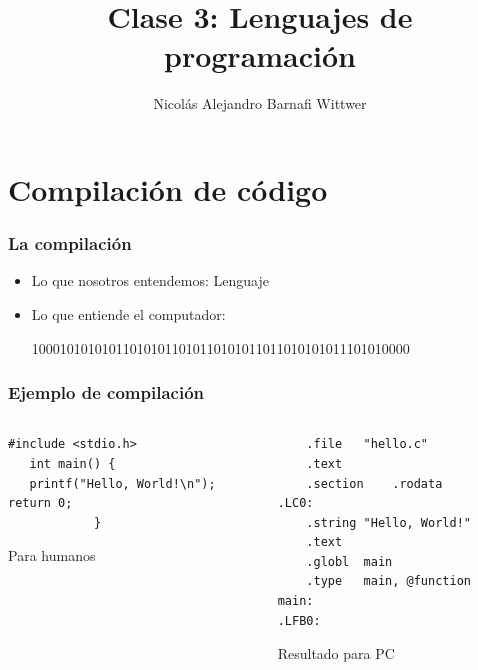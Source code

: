 \documentclass[14pt,aspectratio=169,xcolor=dvipsnames]{beamer}
\title[short title]{Clase 3: Lenguajes de programación}
\subtitle{}
\author[NA Barnafi] {Nicolás Alejandro Barnafi Wittwer}
\institute[UC|CMM] 
{
    Pontificia Universidad Católica de Chile \\
    Centro de Modelamiento Matemático
}
\begin{document}
\begin{frame}
    \maketitle
\end{frame}
\section{Compilación de código}
\begin{frame}[t]\frametitle{La compilación}

    \vspace{1cm}
    \begin{itemize}
        \item<+-> Lo que nosotros entendemos: Lenguaje
        \item<+-> Lo que entiende el computador: 
    
        100010101010110101011010110101011011010101011101010000
            
    \end{itemize}
\end{frame}
\begin{frame}[fragile]\frametitle{Ejemplo de compilación}
\begin{small}
    \begin{columns}
        \begin{column}[b]{0.5\textwidth}
            \begin{verbatim}
#include <stdio.h>
   int main() {
   printf("Hello, World!\n");
return 0;
            }
            \end{verbatim}

    \vfill
            Para humanos
        \end{column}
        \begin{column}[b]{0.45\textwidth}
        
            \begin{verbatim}
    .file	"hello.c"
    .text
    .section	.rodata
.LC0:
    .string	"Hello, World!"
    .text
    .globl	main
    .type	main, @function
main:
.LFB0:
            \end{verbatim}

    \vfill
            Resultado para PC
        \end{column}
    \end{columns}
\end{small}
\end{frame}
\end{document}
